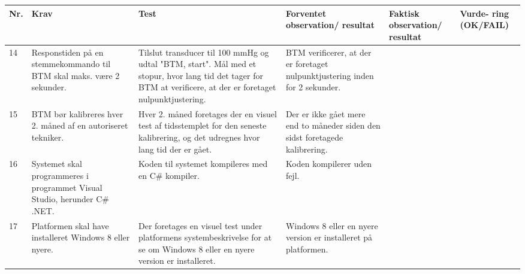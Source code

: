 \begin{table}[H]
\begin{tabular}{|p{0.5cm}|p{4cm}|p{3cm}|p{3cm}|p{3cm}|p{1cm}|}
\hline
\textbf{Nr.} & \textbf{Krav} & \textbf{Test}& \textbf{Forventet observation/ resultat}& \textbf{Faktisk observation/ resultat}& \textbf{Vurde- ring (OK/FAIL)}\\\hline
 14 & Responstiden på en stemmekommando til BTM skal maks. være 2 sekunder. & Tilslut transducer til 100 mmHg og udtal "BTM, start". Mål med et stopur, hvor lang tid det tager for BTM at verificere, at der er foretaget nulpunktjustering.& BTM verificerer, at der er foretaget nulpunktjustering inden for 2 sekunder. & & \\\hline
 15 & BTM bør kalibreres hver 2. måned af en autoriseret tekniker. & Hver 2. måned foretages der en visuel test af tidsstemplet for den seneste kalibrering, og det udregnes hvor lang tid der er gået.& Der er ikke gået mere end to måneder siden den sidst foretagede kalibrering. & & \\\hline
 16 & Systemet skal programmeres i programmet Visual Studio, herunder C\# .NET. & Koden til systemet kompileres med en C# kompiler. & Koden kompilerer uden fejl. & & \\\hline
 17 & Platformen skal have installeret Windows 8 eller nyere. &Der foretages en visuel test under platformens systembeskrivelse for at se om Windows 8 eller en nyere version er installeret. & Windows 8 eller en nyere version er installeret på platformen. & & \\\hline  

\end{tabular}
\end{table}
